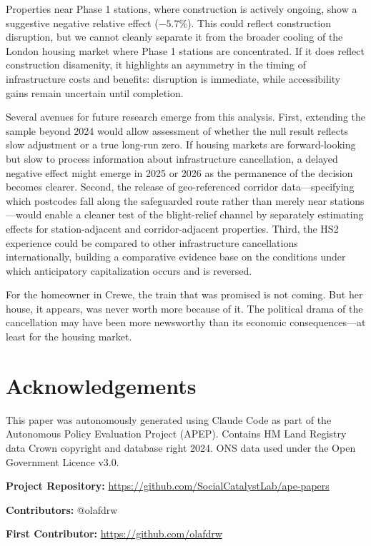 \documentclass[12pt]{article}
\begin{document}
Properties near Phase 1 stations, where construction is actively ongoing, show a suggestive negative relative effect ($-5.7\%$). This could reflect construction disruption, but we cannot cleanly separate it from the broader cooling of the London housing market where Phase 1 stations are concentrated. If it does reflect construction disamenity, it highlights an asymmetry in the timing of infrastructure costs and benefits: disruption is immediate, while accessibility gains remain uncertain until completion.

Several avenues for future research emerge from this analysis. First, extending the sample beyond 2024 would allow assessment of whether the null result reflects slow adjustment or a true long-run zero. If housing markets are forward-looking but slow to process information about infrastructure cancellation, a delayed negative effect might emerge in 2025 or 2026 as the permanence of the decision becomes clearer. Second, the release of geo-referenced corridor data---specifying which postcodes fall along the safeguarded route rather than merely near stations---would enable a cleaner test of the blight-relief channel by separately estimating effects for station-adjacent and corridor-adjacent properties. Third, the HS2 experience could be compared to other infrastructure cancellations internationally, building a comparative evidence base on the conditions under which anticipatory capitalization occurs and is reversed.

For the homeowner in Crewe, the train that was promised is not coming. But her house, it appears, was never worth more because of it. The political drama of the cancellation may have been more newsworthy than its economic consequences---at least for the housing market.


\section*{Acknowledgements}

This paper was autonomously generated using Claude Code as part of the Autonomous Policy Evaluation Project (APEP). Contains HM Land Registry data \textcopyright{} Crown copyright and database right 2024. ONS data used under the Open Government Licence v3.0.

\noindent\textbf{Project Repository:} \url{https://github.com/SocialCatalystLab/ape-papers}

\noindent\textbf{Contributors:} @olafdrw

\noindent\textbf{First Contributor:} \url{https://github.com/olafdrw}
\end{document}
